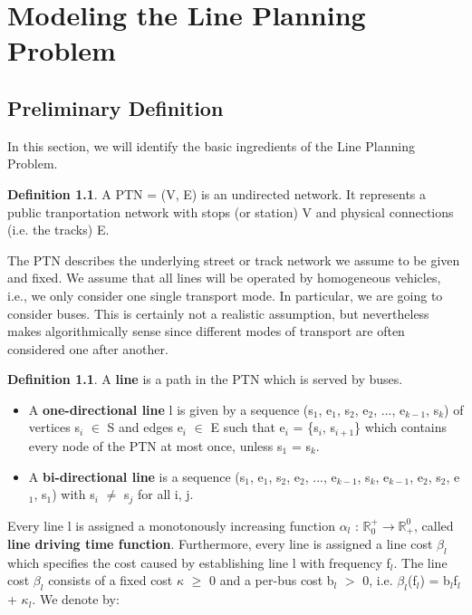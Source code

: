 \documentclass[
  twoside,
  11pt, a4paper,
  footinclude=true,
  headinclude=true,
  cleardoublepage=empty
]{scrbook}
\theoremstyle{definition}
\newtheorem{definition}[theorem]{Definition}
\begin{document}
\chapter{Modeling the Line Planning Problem}

\section{Preliminary Definition}
In this section, we will identify the basic ingredients of the Line Planning Problem.
\begin{definition}
A PTN = (V, E) is an undirected network. It represents a public tranportation network with stops (or station) V and physical connections (i.e. the tracks) E.
\end{definition}
The PTN describes the underlying street or track network we assume to be given and fixed. We assume that all lines will be operated by homogeneous vehicles, i.e., we only consider one single transport mode. In particular, we are going to consider buses. This is certainly not a realistic assumption, but nevertheless makes algorithmically sense since different modes of transport are often considered one after another.
\begin{definition}
A \textbf{line} is a path in the PTN which is served by buses. 
\begin{itemize}
\item A \textbf{one-directional line} l is given by a sequence (s$_1$, e$_1$, s$_2$, e$_2$, ..., e$_{k-1}$, s$_k$) of vertices s$_i$ $\in$ S and edges e$_i$ $\in$ E such that e$_i$ = \{s$_i$, s$_{i+1}$\} which contains every node of the PTN at most once, unless s$_1$ = s$_k$.
\item A \textbf{bi-directional line} is a sequence (s$_1$, e$_1$, s$_2$, e$_2$, ..., e$_{k-1}$, s$_k$, e$_{k-1}$, e$_2$, s$_2$, e$_1$, s$_1$) with s$_i$ $\ne$ s$_j$ for all i, j.
\end{itemize}
\end{definition}
Every line l is assigned a monotonously increasing function $\alpha_l$ : $\mathbb{R}^+_0 \rightarrow \mathbb{R}^0_+$, called \textbf{line driving time function}. \newline
Furthermore, every line is assigned a line cost $\beta_l$ which specifies the cost caused by establishing line l with frequency f$_l$. The line cost $\beta_l$ consists of a fixed cost $\kappa$ $\ge$ 0 and a per-bus cost b$_l$ $>$ 0, i.e. $\beta_l$(f$_l$) = b$_l$f$_l$ + $\kappa_l$. \newline
We denote by:
\end{document}

